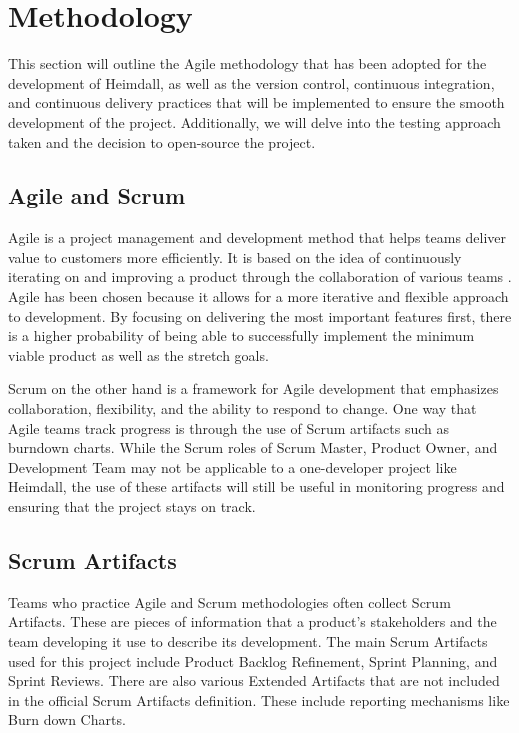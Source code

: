 \documentclass{article}
\begin{document}
 
\section{Methodology} \label{methodology}

This section will outline the Agile methodology that has been adopted for the development of Heimdall, as well as the version control, continuous integration, and continuous delivery practices that will be implemented to ensure the smooth development of the project. Additionally, we will delve into the testing approach taken and the decision to open-source the project.


\subsection{Agile and Scrum} \label{agile}

Agile is a project management and development method that helps teams deliver value to customers more efficiently. It is based on the idea of continuously iterating on and improving a product through the collaboration of various teams \cite{what-is-agile}. Agile has been chosen because it allows for a more iterative and flexible approach to development. By focusing on delivering the most important features first, there is a higher probability of being able to successfully implement the minimum viable product as well as the stretch goals. \\\par Scrum on the other hand is a framework for Agile development that emphasizes collaboration, flexibility, and the ability to respond to change. One way that Agile teams track progress is through the use of Scrum artifacts such as burndown charts. While the Scrum roles of Scrum Master, Product Owner, and Development Team may not be applicable to a one-developer project like Heimdall, the use of these artifacts will still be useful in monitoring progress and ensuring that the project stays on track.


\subsection{Scrum Artifacts} \label{artifacts}
Teams who practice Agile and Scrum methodologies often collect Scrum Artifacts. These are pieces of information that a product's stakeholders and the team developing it use to describe its development. The main Scrum Artifacts used for this project include Product Backlog Refinement, Sprint Planning, and Sprint Reviews. There are also various Extended Artifacts that are not included in the official Scrum Artifacts definition. These include reporting mechanisms like Burn down Charts.
\end{document}
